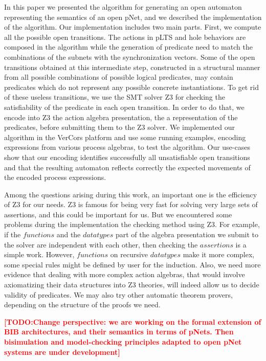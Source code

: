 \documentclass{lncs/llncs}
\newcommand{\TODO}[1]{\textcolor{red}{\textbf{[TODO:#1]}}}
\begin{document}
In this paper we presented the algorithm for generating an open
automaton representing the semantics of an open pNet, and we described
the implementation of the
algorithm. Our implementation includes two main parts. First, we
compute all the possible open transitions. The actions in pLTS and
hole behaviors are composed in the algorithm while the generation of
predicate need to match the combinations of the subnets with the
synchronization vectors. Some of the open transitions obtained at this
intermediate step, constructed in a structural manner from all
possible combinations of possible logical predicates, may
contain predicates which do not represent any possible concrete
instantiations. 
To get rid of these useless transitions, we use the SMT solver Z3 for checking the
satisfiability of the predicate in each open transition. In
order to do that, we encode into Z3 the action algebra presentation,
the a representation of the predicates, before submitting them to the
Z3 solver. We implemented our algorithm in the VerCors platform and use some
running examples, encoding expressions from various process algebras, to test the
algorithm. Our use-cases show that our encoding
identifies successfully all unsatisfiable open transitions and that
the resulting automaton reflects correctly the expected 
movements of the encoded process expressions.   

Among the questions arising during this work, an important one is the
efficiency of Z3 for our needs. Z3 is famous for being very fast for
solving very large sets of assertions, and this could be important for
us. But we encountered  some problems during the implementation the
checking method using Z3. For example, if the $functions$ and the
$datatypes$ part of the algebra presentation we submit to the solver
are independent with each other, then checking the $assertions$ is a
simple work. However, $functions$ on recursive $datatypes$ make it
more complex, some special rules might be defined by user for the
induction. Also, we need more evidence that dealing with more complex
action algebras, that would involve axiomatizing their data structures
into Z3 theories, will indeed allow us to decide validity of
predicates.
We may also try other automatic theorem provers, depending on the structure of the proofs we need.

\TODO{Change perspective: we are working on the formal extension of
  BIB architectures, and their semantics in terms of pNets. Then
  bisimulation and model-checking principles adapted to open pNet
  systems are under development}
\end{document}
